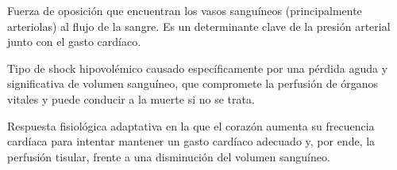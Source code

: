 \documentclass[12pt, letterpaper]{article}
\begin{document}
\begin{description}[style=unboxed, leftmargin=0cm]
    \item[\textbf{Resistencia Periférica Total (RPT):}] Fuerza de oposición que encuentran los vasos sanguíneos (principalmente arteriolas) al flujo de la sangre. Es un determinante clave de la presión arterial junto con el gasto cardíaco.
    
    \item[\textbf{Shock hemorrágico:}] Tipo de shock hipovolémico causado específicamente por una pérdida aguda y significativa de volumen sanguíneo, que compromete la perfusión de órganos vitales y puede conducir a la muerte si no se trata.
    
    \item[\textbf{Taquicardia compensatoria:}] Respuesta fisiológica adaptativa en la que el corazón aumenta su frecuencia cardíaca para intentar mantener un gasto cardíaco adecuado y, por ende, la perfusión tisular, frente a una disminución del volumen sanguíneo.
\end{description}
\newpage

\listoftables
{}
\newpage



\newpage


\newpage


\newpage


\newpage


\newpage


\newpage


\newpage


\newpage


\newpage


\newpage


\end{document}
